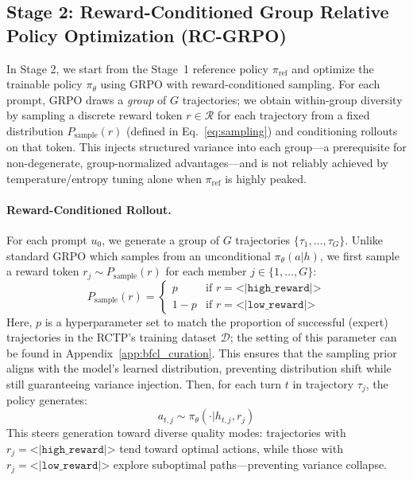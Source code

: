 \documentclass{article}
\theoremstyle{plain}
\theoremstyle{definition}
\theoremstyle{remark}
\begin{document}
\subsection{Stage 2: Reward-Conditioned Group Relative Policy Optimization (RC-GRPO)}
\label{sec:rcgrpo}

In Stage 2, we start from the Stage~1 reference policy $\pi_{\text{ref}}$ and optimize the trainable policy $\pi_\theta$ using GRPO with reward-conditioned sampling. For each prompt, GRPO draws a \emph{group} of $G$ trajectories; we obtain within-group diversity by sampling a discrete reward token $r \in \mathcal{R}$ for each trajectory from a fixed distribution $P_{\text{sample}}(r)$ (defined in Eq.~\ref{eq:sampling}) and conditioning rollouts on that token. This injects structured variance into each group---a prerequisite for non-degenerate, group-normalized advantages---and is not reliably achieved by temperature/entropy tuning alone when $\pi_{\text{ref}}$ is highly peaked.

\paragraph{Reward-Conditioned Rollout.}
For each prompt $u_0$, we generate a group of $G$ trajectories $\{\tau_1, \dots, \tau_G\}$. Unlike standard GRPO which samples from an unconditional $\pi_\theta(a|h)$, we first sample a reward token $r_j \sim P_{\text{sample}}(r)$ for each member $j \in \{1, \dots, G\}$:
\begin{equation}
\label{eq:sampling}
    P_{\text{sample}}(r) = 
    \begin{cases} 
    p & \text{if } r = \texttt{<|high\_reward|>} \\
    1-p & \text{if } r = \texttt{<|low\_reward|>}
    \end{cases}
\end{equation}
Here, $p$ is a hyperparameter set to match the proportion of successful (expert) trajectories in the RCTP's training dataset $\mathcal{D}$; the setting of this parameter can be found in Appendix~\ref{app:bfcl_curation}. This ensures that the sampling prior aligns with the model's learned distribution, preventing distribution shift while still guaranteeing variance injection. Then, for each turn $t$ in trajectory $\tau_j$, the policy generates:
\begin{equation}
    a_{t,j} \sim \pi_\theta(\cdot | h_{t,j}, r_j)
\end{equation}
This steers generation toward diverse quality modes: trajectories with $r_j = \texttt{<|high\_reward|>}$ tend toward optimal actions, while those with $r_j = \texttt{<|low\_reward|>}$ explore suboptimal paths—preventing variance collapse.
\end{document}
